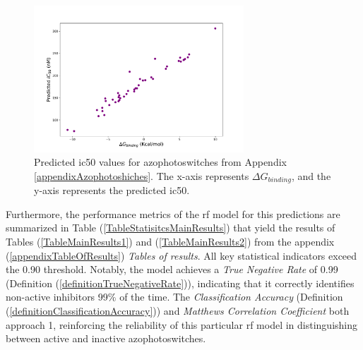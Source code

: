 \documentclass[11pt]{article}
\begin{document}
\begin{figure}[H]
	\centering
	\includegraphics[width=0.7\textwidth, trim={1.5cm 0.6cm 2.4cm 2cm}, clip]{../Plots/GbindingVSIC50.pdf}
	\caption{Predicted \gls{ic50} values for azophotoswitches from Appendix \ref{appendixAzophotoshiches}. The x-axis represents $\Delta G_{binding}$, and the y-axis represents the predicted \gls{ic50}.}
	\label{figureGraphicGbindingIC50}
\end{figure}

Furthermore, the performance metrics of the \gls{rf} model for this predictions are summarized in Table (\ref{TableStatisitcsMainResults}) that yield the results of Tables (\ref{TableMainResults1}) and (\ref{TableMainResults2}) from the appendix (\ref{appendixTableOfResults}) \emph{Tables of results}. All key statistical indicators exceed the 0.90 threshold. Notably, the model achieves a \emph{True Negative Rate} of 0.99 (Definition (\ref{definitionTrueNegativeRate})), indicating that it correctly identifies non-active inhibitors 99\% of the time. The \emph{Classification Accuracy} (Definition (\ref{definitionClassificationAccuracy})) and \emph{Matthews Correlation Coefficient} both approach 1, reinforcing the reliability of this particular \gls{rf} model in distinguishing between active and inactive azophotoswitches.

\end{document}
